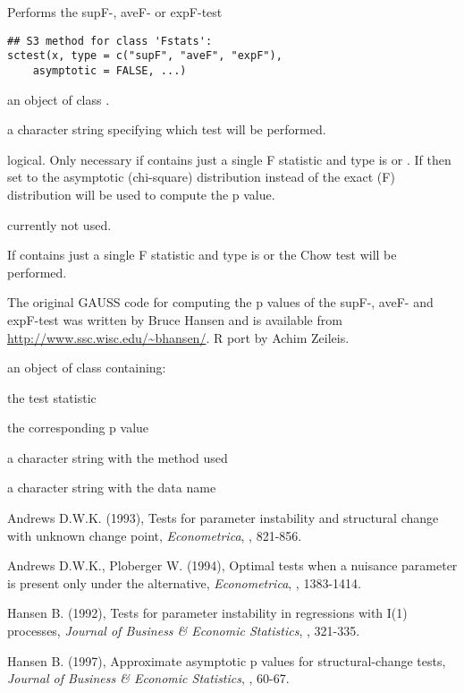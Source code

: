 \begin{Description}\relax
Performs the supF-, aveF- or expF-test\end{Description}
\begin{Usage}
\begin{verbatim}
## S3 method for class 'Fstats':
sctest(x, type = c("supF", "aveF", "expF"),
    asymptotic = FALSE, ...)
\end{verbatim}
\end{Usage}
\begin{Arguments}
\begin{ldescription}
\item[\code{x}] an object of class .
\item[\code{type}] a character string specifying which test will be performed.
\item[\code{asymptotic}] logical. Only necessary if  contains just a single F
statistic and type is  or . If then set to
 the asymptotic (chi-square) distribution instead of the exact
(F) distribution will be used to compute the p value.
\item[\code{...}] currently not used.
\end{ldescription}
\end{Arguments}
\begin{Details}\relax
If  contains just a single F statistic and type is
 or  the Chow test will be performed.

The original GAUSS code for computing the p values of the supF-, aveF- and
expF-test was written by Bruce Hansen and is available from
\url{http://www.ssc.wisc.edu/~bhansen/}. R port by Achim Zeileis.\end{Details}
\begin{Value}
an object of class  containing:
\begin{ldescription}
\item[\code{statistic}] the test statistic
\item[\code{p.value}] the corresponding p value
\item[\code{method}] a character string with the method used
\item[\code{data.name}] a character string with the data name
\end{ldescription}
\end{Value}
\begin{References}\relax
Andrews D.W.K. (1993), Tests for parameter instability and structural
change with unknown change point, \emph{Econometrica}, , 821-856.

Andrews D.W.K., Ploberger W. (1994), Optimal tests when a nuisance parameter
is present only under the alternative, \emph{Econometrica}, , 1383-1414.

Hansen B. (1992), Tests for parameter instability in regressions with I(1)
processes, \emph{Journal of Business \& Economic Statistics}, , 321-335.

Hansen B. (1997), Approximate asymptotic p values for structural-change
tests, \emph{Journal of Business \& Economic Statistics}, , 60-67.\end{References}
